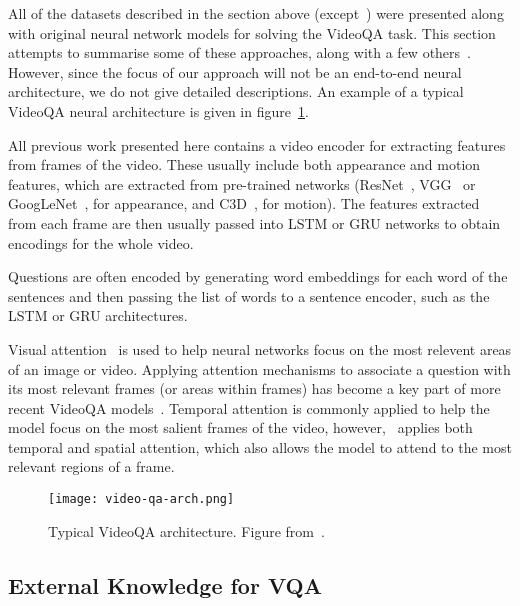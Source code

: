 \documentclass[../interim.tex]{subfiles}
\begin{document}
All of the datasets described in the section above (except~\cite{dataset:ego-vqa}) were presented along with original neural network models for solving the VideoQA task. This section attempts to summarise some of these approaches, along with a few others~\cite{videoqa:co-mem, videoqa:cwd, videoqa:mm-att, videoqa:strr}. However, since the focus of our approach will not be an end-to-end neural architecture, we do not give detailed descriptions. An example of a typical VideoQA neural architecture is given in figure~\ref{fig:video-qa-arch}.

All previous work presented here contains a video encoder for extracting features from frames of the video. These usually include both appearance and motion features, which are extracted from pre-trained networks (ResNet~\cite{resnet}, VGG~\cite{vgg} or GoogLeNet~\cite{googlenet}, for appearance, and C3D~\cite{c3d}, for motion). The features extracted from each frame are then usually passed into LSTM or GRU networks to obtain encodings for the whole video.

Questions are often encoded by generating word embeddings for each word of the sentences and then passing the list of words to a sentence encoder, such as the LSTM or GRU architectures.

Visual attention~\cite{visual-attention} is used to help neural networks focus on the most relevent areas of an image or video. Applying attention mechanisms to associate a question with its most relevant frames (or areas within frames) has become a key part of more recent VideoQA models~\cite{dataset:tgif-qa, dataset:xu, dataset:youtube2text-qa, dataset:tvqa, videoqa:co-mem, videoqa:cwd, videoqa:mm-att, dataset:pororo-qa}. Temporal attention is commonly applied to help the model focus on the most salient frames of the video, however,~\cite{dataset:tgif-qa} applies both temporal and spatial attention, which also allows the model to attend to the most relevant regions of a frame.

\begin{figure}
  \centering
  \texttt{[image: video-qa-arch.png]}
  \caption{Typical VideoQA architecture. Figure from~\cite{dataset:ego-vqa}.}
  \label{fig:video-qa-arch}
\end{figure}


\subsection{External Knowledge for VQA}
\end{document}
